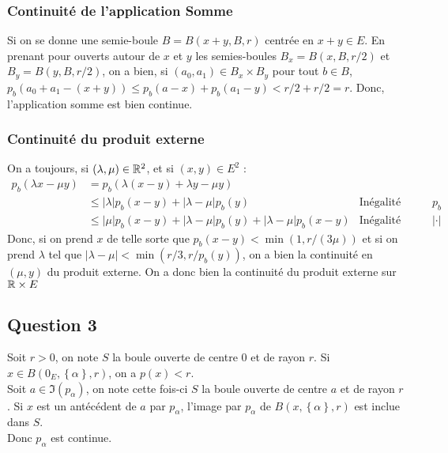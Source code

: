 \documentclass{cours}
\newcommand{\abs}[1]{\left|#1\right|}
\begin{document}
            \subsubsection{Continuité de l'application Somme}
                Si on se donne une semie-boule $B = B(x + y, B, r)$ centrée en $x + y \in E$. 
                En prenant pour ouverts autour de $x$ et $y$ les semies-boules $B_{x} = B(x, B, r/2)$ et $B_{y} = B(y, B, r/2)$, on a bien, si $(a_0, a_1) \in B_{x} \times B_{y}$ pour tout $b \in B$, $p_{b}(a_0 + a_1 - (x + y)) \leq p_{b}(a - x) + p_{b}(a_1 - y) < r/2 + r/2 = r$. 
                Donc, l'application somme est bien continue.
            \subsubsection{Continuité du produit externe}
                On a toujours, si $(\lambda, \mu) \in \mathbb{R}^2$, et si $(x, y) \in E^2$ : 
                \[\begin{aligned} 
                    p_{b}(\lambda x - \mu y) &= p_{b}(\lambda (x-y) +\lambda y - \mu y) & \\
                    &\leq \left|\lambda\right| p_{b}(x - y) + \left|\lambda - \mu\right|p_{b}(y) &\text{Inégalité Triangulaire sur } p_{b}\\
                    &\leq \left|\mu\right| p_{b}(x - y) + \left|\lambda - \mu\right|p_{b}(y) + \left|\lambda - \mu\right|p_{b}(x - y) &\text{Inégalité Triangulaire sur }\left|\cdot\right|
                \end{aligned}\]
                Donc, si on prend $x$ de telle sorte que $p_{b}(x-y) < \min(1, r/(3\mu))$ et si on prend $\lambda$ tel que $\abs{\lambda - \mu} < \min(r/3, r/p_{b}(y))$, on a bien la continuité en $(\mu, y)$ du produit externe. On a donc bien la continuité du produit externe sur $\mathbb{R} \times E$

        \subsection{Question 3}
            Soit $r > 0$, on note $S$ la boule ouverte de centre $0$ et de rayon $r$. Si $x \in B(0_{E}, \left\{\alpha\right\}, r)$, on a $p(x) < r$.\\
            Soit $a \in \Im(p_{\alpha})$, on note cette fois-ci $S$ la boule ouverte de centre $a$ et de rayon $r$. Si $x$ est un antécédent de $a$ par $p_{\alpha}$, l'image par $p_{\alpha}$ de $B(x, \left\{\alpha\right\}, r)$ est inclue dans $S$.\\
            Donc $p_{\alpha}$ est continue.
\end{document}

